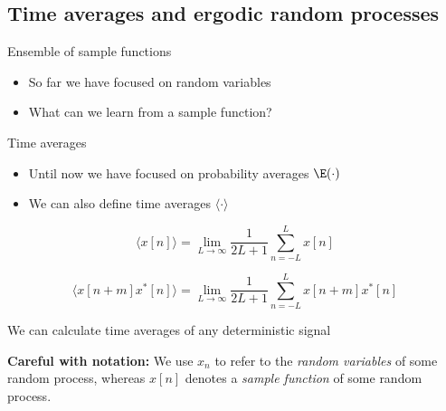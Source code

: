 \documentclass[10pt, aspectratio=169]{beamer}
\begin{document}
\subsection{Time averages and ergodic random processes}

\begin{frame}{Ensemble of sample functions}
\begin{itemize}
	\item So far we have focused on random variables
	\item What can we learn from a sample function?
\end{itemize}
\begin{center}
	\resizebox{0.75\linewidth}{!}{}
\end{center}
\end{frame}

%
\begin{frame}{Time averages}

\begin{itemize}
	\item Until now we have focused on probability averages $\E(\cdot)$
	\item We can also define time averages $\langle\cdot\rangle$
\end{itemize}

\begin{equation*}
\langle x[n] \rangle = \lim_{L\to\infty}\frac{1}{2L + 1}\sum_{n=-L}^L x[n]
\end{equation*}

\begin{equation*}
\langle x[n+m]x^*[n] \rangle = \lim_{L\to\infty}\frac{1}{2L + 1}\sum_{n=-L}^L x[n+m]x^*[n]
\end{equation*}

We can calculate time averages of any deterministic signal

\begin{center}
	\resizebox{0.6\linewidth}{!}{}
\end{center}

\textbf{Careful with notation:} We use $x_n$ to refer to the \textit{random variables} of some random process, whereas $x[n]$ denotes a \textit{sample function} of some random process.

\end{frame}
\end{document}
